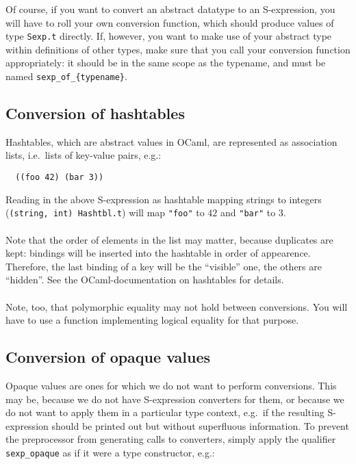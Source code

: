 \documentclass[a4paper]{article}
\begin{document}
Of course, if you want to convert an abstract datatype to an S-expression,
you will have to roll your own conversion function, which should produce
values of type \verb=Sexp.t= directly.  If, however, you want to make
use of your abstract type within definitions of other types, make sure
that you call your conversion function appropriately: it should be in the
same scope as the typename, and must be named \verb=sexp_of_{typename}=.

\subsection{Conversion of hashtables}

Hashtables, which are abstract values in OCaml, are represented as
association lists, i.e.\ lists of key-value pairs, e.g.:

\begin{verbatim}
  ((foo 42) (bar 3))
\end{verbatim}

Reading in the above S-expression as hashtable mapping strings to
integers (\verb=(string, int) Hashtbl.t=) will map \verb="foo"= to $42$
and \verb="bar"= to $3$.\\
\\
Note that the order of elements in the list may matter, because
duplicates are kept: bindings will be inserted into the hashtable in
order of appearence.  Therefore, the last binding of a key will be the
``visible'' one, the others are ``hidden''.  See the OCaml-documentation
on hashtables for details.\\
\\
Note, too, that polymorphic equality may not hold between conversions.
You will have to use a function implementing logical equality for that
purpose.

\subsection{Conversion of opaque values}

Opaque values are ones for which we do not want to perform conversions.
This may be, because we do not have S-expression converters for them,
or because we do not want to apply them in a particular type context,
e.g.\ if the resulting S-expression should be printed out but without
superfluous information.  To prevent the preprocessor from generating
calls to converters, simply apply the qualifier \verb=sexp_opaque=
as if it were a type constructor, e.g.:
\end{document}
